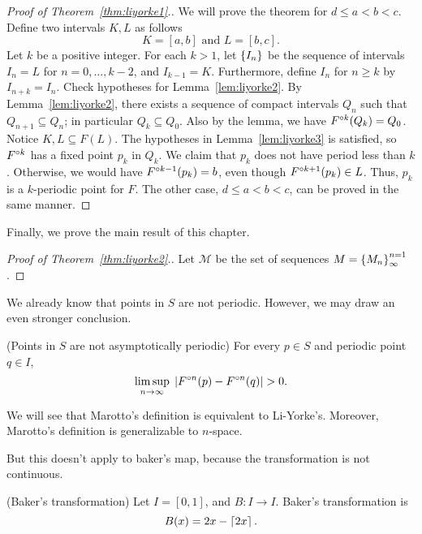 \documentclass[12pt,draft,twoside]{book}
\begin{document}
\begin{proof}[Proof of Theorem~\ref{thm:liyorke1}.]
  We will prove the theorem for $d \leq a < b < c$.
  Define two intervals $K,L$ as follows
  \begin{equation*}
    K = [a,b] \mbox{ and } L = [b,c].
  \end{equation*}
  Let $k$ be a positive integer.
  For each $k > 1$, let $\left \{ I_n \right \}$ be the sequence of intervals $I_n = L$ for $n = 0, \ldots, k-2$, and $I_{k-1} = K$.
  Furthermore, define $I_n$ for $n \geq k$ by $I_{n+k} = I_n$.
  Check hypotheses for Lemma~\ref{lem:liyorke2}.
  By Lemma~\ref{lem:liyorke2}, there exists a sequence of compact intervals $Q_n$ such that $Q_{n+1} \subseteq Q_{n}$; in particular $Q_k \subseteq Q_0$.
  Also by the lemma, we have $F^{\circ k}(Q_k) = Q_0$.
  Notice $K, L \subseteq F(L)$.
  The hypotheses in Lemma~\ref{lem:liyorke3} is satisfied, so $F^{\circ k}$ has a fixed point $p_k$ in $Q_k$.
  We claim that $p_k$ does not have period less than $k$.
  Otherwise, we would have $F^{\circ k-1}(p_k) = b$, even though $F^{\circ k+1}(p_k) \in L$.
  Thus, $p_k$ is a $k$-periodic point for $F$.
  The other case, $d \leq a < b < c$, can be proved in the same manner.
\end{proof}

Finally, we prove the main result of this chapter.
\begin{proof}[Proof of Theorem~\ref{thm:liyorke2}.]
  Let $\mathcal{M}$ be the set of sequences $M = \left \{ M_n \right \}^{n=1}_{\infty}$.
\end{proof}

We already know that points in $S$ are not periodic.
However, we may draw an even stronger conclusion.
\begin{theorem}
  (Points in $S$ are not asymptotically periodic)
  For every $p \in S$ and periodic point $q \in I$,
  \begin{equation*}
    \limsup\limits_{n \to \infty}\; \left | F^{\circ n}(p) - F^{\circ n}(q) \right | > 0.
  \end{equation*}
  \label{thm:liyorke3}
\end{theorem}

We will see that Marotto's definition is equivalent to Li-Yorke's.
Moreover, Marotto's definition is generalizable to $n$-space.

But this doesn't apply to baker's map, because the transformation is not continuous.
\begin{definition}
  (Baker's transformation)
  Let $I = [0,1]$, and $B: I \to I$. Baker's transformation is
  \begin{equation*}
    B(x) = 2x - \left \lceil 2x \right \rceil.
  \end{equation*}
\end{definition}
\end{document}
